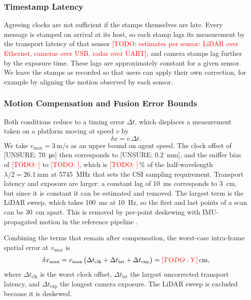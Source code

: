 \documentclass[conference]{IEEEtran}
\newcommand{\todo}[1]{\textcolor{red}{[TODO: #1]}}
\newcommand{\unsure}[1]{\textcolor{darkyellow}{[UNSURE: #1]}}
\begin{document}
\subsubsection{Timestamp Latency}
Agreeing clocks are not sufficient if the stamps themselves are
late. Every message is stamped on arrival at its host, so each stamp
lags its measurement by the transport latency of that sensor
\todo{estimates per sensor: LiDAR over Ethernet, cameras over USB,
radar over UART}, and camera stamps lag further by the exposure time.
These lags are approximately constant for a given sensor. We leave
the stamps as recorded so that users can apply their own correction,
for example by aligning the motion observed by each sensor.

\subsubsection{Motion Compensation and Fusion Error Bounds}
\label{sec:temporal_bounds}
Both conditions reduce to a timing error $\Delta t$, which displaces
a measurement taken on a platform moving at speed $v$ by
\begin{equation}
  \delta x = v \, \Delta t .
  \label{eq:time_bound}
\end{equation}
We take $v_{\max} = \SI{3}{\metre\per\second}$ as an upper bound on
agent speed. The clock offset of \unsure{\SI{70}{\micro\second}} then
corresponds to \unsure{\SI{0.2}{\milli\metre}}, and the sniffer bias
of \todo{} to \todo{}, which is \todo{}\,\% of the half-wavelength
$\lambda/2 = \SI{26.1}{\milli\metre}$ at \SI{5745}{\mega\hertz} that
sets the CSI sampling requirement. Transport latency and exposure are
larger: a constant lag of \SI{10}{\milli\second} corresponds to
\SI{3}{\centi\metre}, but since it is constant it can be estimated
and removed. The largest term is the LiDAR sweep, which takes
\SI{100}{\milli\second} at \SI{10}{\hertz}, so the first and last
points of a scan can be \SI{30}{\centi\metre} apart. This is removed
by per-point deskewing with IMU-propagated motion in the reference
pipeline \cite{glim}.

Combining the terms that remain after compensation, the worst-case
intra-frame spatial error at $v_{\max}$ is
\begin{equation}
  \delta x_{\max} = v_{\max}\,\big(\Delta t_{\mathrm{clk}}
  + \Delta t_{\mathrm{lat}} + \Delta t_{\mathrm{exp}}\big)
  = \todo{Y}\,\si{\centi\metre},
  \label{eq:fusion_bound}
\end{equation}
where $\Delta t_{\mathrm{clk}}$ is the worst clock offset,
$\Delta t_{\mathrm{lat}}$ the largest uncorrected transport latency,
and $\Delta t_{\mathrm{exp}}$ the longest camera exposure. The LiDAR
sweep is excluded because it is deskewed.
\end{document}
